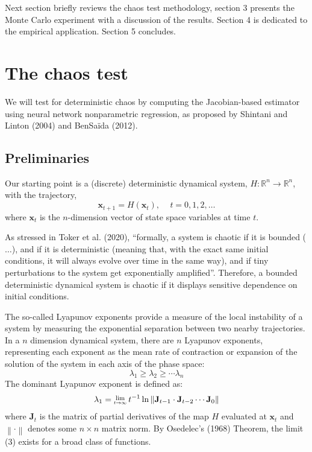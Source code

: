 \documentclass[12pt]{article}
\newcommand{\Lim}[1]{\raisebox{0.5ex}{\scalebox{0.8}{$\displaystyle \lim_{#1}\;$}}}
\newcommand{\norm}[1]{\left\lVert#1\right\rVert}
\begin{document}
Next section briefly reviews the chaos test methodology, section 3 presents the Monte Carlo experiment with a discussion of the results. Section 4 is dedicated to the empirical application. Section 5 concludes.


\section{The chaos test}


We will test for deterministic chaos by computing the
Jacobian-based estimator using neural network nonparametric regression,
as proposed by Shintani and Linton (2004) and BenSa\"{i}da (2012).


	
\subsection{Preliminaries}


Our starting point is a (discrete) deterministic dynamical system, $H: \mathbb{R}^n \rightarrow \mathbb{R}^n$, with the trajectory,
\begin{equation}
\mathbf{x}_{t+1}=H(\mathbf{x}_t),\,\,\,\,\,\,\, t=0,1,2,\ldots
\end{equation}
where $\mathbf{x}_t$ is the $n$-dimension vector of state space variables at time $t$.


As stressed in Toker et al. (2020), ``formally, a system is chaotic if it is bounded ($\ldots$), and if it is deterministic (meaning that, with the exact same initial conditions, it will always evolve over time in the same way), and if tiny perturbations to the system get exponentially amplified''. Therefore, a bounded deterministic dynamical system is chaotic if it displays  sensitive dependence on initial conditions.


The so-called Lyapunov exponents  provide a measure of the
 local instability of a system by measuring the exponential separation between two nearby trajectories. In a $n$ dimension dynamical system, there are $n$ Lyapunov exponents, representing each exponent as the mean rate of contraction or expansion of the solution of
the system in each axis of the phase space:
\begin{equation}
\lambda_1 \geq\lambda_2 \geq \cdots\lambda_n
\end{equation} 
The dominant Lyapunov exponent is defined as:
\begin{equation}
\lambda_1=\Lim{t \rightarrow \infty} t^{-1}\ln \norm{ \mathbf{J}_{t-1}\cdot\mathbf{J}_{t-2}\cdots \mathbf{J}_{0} }
\end{equation}
where $\mathbf{J}_{t}$ is the matrix of partial derivatives of the map $H$ evaluated at $\mathbf{x}_{t}$ and $\norm \cdot$ denotes some $n\times n$ matrix norm. By Osedelec's (1968) Theorem, the limit (3) exists for a broad class of functions. 
\end{document}
